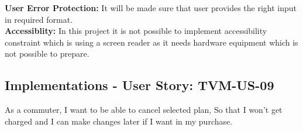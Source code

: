 \documentclass[a4paper,12pt]{report}
\begin{document}
\begin{flushleft}
	\vspace{0.5cm}
	\textbf{User Error Protection:} It will be made sure that user provides the right input in required format. \\
	\textbf{Accessiblity: } In this project it is not possible to implement accessibility constraint which is using a screen reader as it needs hardware equipment which is not possible to prepare. \\
	
\end{flushleft}





\FloatBarrier
\vspace{0.5cm}
\subsection{Implementations - User Story: TVM-US-09}
As a commuter, I want to be able to cancel selected plan, So that I won't get charged and I can make changes later if I want in my purchase.
\end{document}
